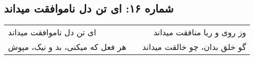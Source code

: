 \begin{center}
\section*{شماره ۱۶: ای تن دل ناموافقت میداند}
\label{sec:016}
\begin{longtable}{l p{0.5cm} r}
ای تن دل ناموافقت میداند
&&
وز روی و ریا منافقت میداند
\\
هر فعل که میکنی، بد و نیک، مپوش
&&
گو خلق بدان، چو خالقت میداند
\\
\end{longtable}
\end{center}
